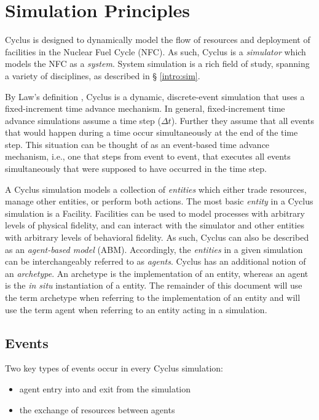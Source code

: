
\section{Simulation Principles}\label{abm:sim}

Cyclus is designed to dynamically model the flow of resources and deployment of
facilities in the Nuclear Fuel Cycle (NFC). As such, Cyclus is a
\textit{simulator} which models the NFC as a \textit{system}. System simulation
is a rich field of study, spanning a variety of disciplines, as described in \S
\ref{intro:sim}.

By Law's definition \cite{Law:1999:SMA:554952}, Cyclus is a dynamic,
discrete-event simulation that uses a fixed-increment time advance mechanism. In
general, fixed-increment time advance simulations assume a time step ($\Delta
t$). Further they assume that all events that would happen during a time occur
simultaneously at the end of the time step. This situation can be thought of as
an event-based time advance mechanism, i.e., one that steps from event to event,
that executes all events simultaneously that were supposed to have occurred in
the time step.

A Cyclus simulation models a collection of \textit{entities} which either trade
resources, manage other entities, or perform both actions. The most basic
\textit{entity} in a Cyclus simulation is a Facility. Facilities can be used to
model processes with arbitrary levels of physical fidelity, and can interact
with the simulator and other entities with arbitrary levels of behavioral
fidelity. As such, Cyclus can also be described as an \textit{agent-based model}
(ABM). Accordingly, the \textit{entities} in a given simulation can be
interchangeably referred to as \textit{agents}. Cyclus has an additional notion
of an \textit{archetype}. An archetype is the implementation of an entity,
whereas an agent is the \textit{in situ} instantiation of a entity. The
remainder of this document will use the term archetype when referring to the
implementation of an entity and will use the term agent when referring to an
entity acting in a simulation.

\subsection{Events}

Two key types of events occur in every Cyclus simulation:

\begin{itemize}
\item agent entry into and exit from the simulation
\item the exchange of resources between agents
\end{itemize}

